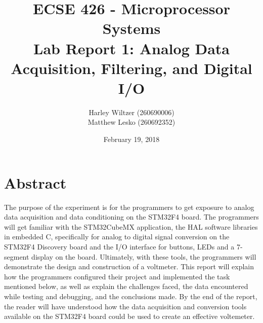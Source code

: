\documentclass[12pt]{report}
\title{ECSE 426 - Microprocessor Systems\\Lab Report 1: Analog Data Acquisition, Filtering, and
Digital I/O}
\author{Harley Wiltzer (260690006)\\Matthew Lesko (260692352)}
\date{February 19, 2018}
\begin{document}
\maketitle
\tableofcontents
\let\clearpage\relax
\listoffigures
\let\clearpage\relax
\listoftables
\newpage
\section{Abstract}
The purpose of the experiment is for the programmers to get exposure to analog data acquisition and
data conditioning on the STM32F4 board. The programmers will get familiar with the STM32CubeMX application, the HAL
software libraries in embedded C, specifically for analog to digital signal conversion on the
STM32F4 Discovery board and the I/O interface for buttons, LEDs and a 7-segment display on the
board. Ultimately, with these tools, the programmers will demonstrate the design and construction of
a voltmeter. This report will explain how the programmers configured their project and implemented the
task mentioned below, as well as explain the challenges faced, the data
encountered while testing and debugging, and the conclusions made. By the end of the report, the reader will have understood how the data acquisition and conversion tools available on the STM32F4 board could be used to create an effective voltemeter.
\end{document}
